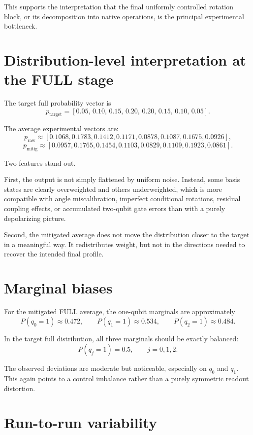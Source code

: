\documentclass[11pt]{article}
\begin{document}
This supports the interpretation that the final uniformly controlled rotation block, or its decomposition into native operations, is the principal experimental bottleneck.

\section{Distribution-level interpretation at the FULL stage}

The target full probability vector is
\[
p_{\mathrm{target}} =
[0.05,\,0.10,\,0.15,\,0.20,\,0.20,\,0.15,\,0.10,\,0.05].
\]

The average experimental vectors are:
\[
p_{\mathrm{raw}} \approx [0.1068, 0.1783, 0.1412, 0.1171, 0.0878, 0.1087, 0.1675, 0.0926],
\]
\[
p_{\mathrm{mitig}} \approx [0.0957, 0.1765, 0.1454, 0.1103, 0.0829, 0.1109, 0.1923, 0.0861].
\]

Two features stand out.

First, the output is not simply flattened by uniform noise. Instead, some basis states are clearly overweighted and others underweighted, which is more compatible with angle miscalibration, imperfect conditional rotations, residual coupling effects, or accumulated two-qubit gate errors than with a purely depolarizing picture.

Second, the mitigated average does not move the distribution closer to the target in a meaningful way. It redistributes weight, but not in the directions needed to recover the intended final profile.

\section{Marginal biases}

For the mitigated FULL average, the one-qubit marginals are approximately
\[
P(q_0=1)\approx 0.472,\qquad
P(q_1=1)\approx 0.534,\qquad
P(q_2=1)\approx 0.484.
\]

In the target full distribution, all three marginals should be exactly balanced:
\[
P(q_j=1)=0.5,\qquad j=0,1,2.
\]

The observed deviations are moderate but noticeable, especially on $q_0$ and $q_1$. This again points to a control imbalance rather than a purely symmetric readout distortion.

\section{Run-to-run variability}
\end{document}
